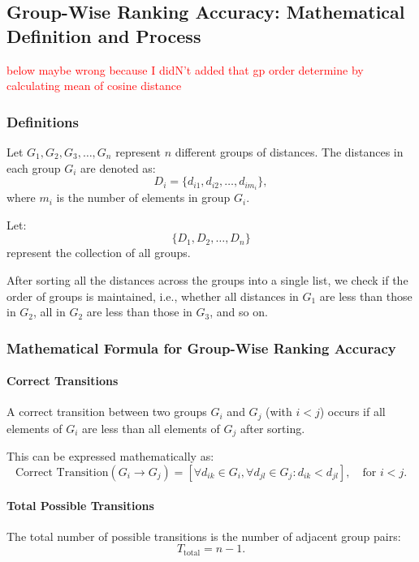 \subsection*{Group-Wise Ranking Accuracy: Mathematical Definition and Process}

\textcolor{red}{below maybe wrong because I didN't added that gp order determine by calculating mean of cosine distance}

\subsubsection*{Definitions}

Let \( G_1, G_2, G_3, \dots, G_n \) represent \( n \) different groups of distances.  
The distances in each group \( G_i \) are denoted as:
\[
D_i = \{d_{i1}, d_{i2}, \dots, d_{im_i}\},
\]
where \( m_i \) is the number of elements in group \( G_i \).  

Let:
\[
\{D_1, D_2, \dots, D_n\}
\]
represent the collection of all groups.

After sorting all the distances across the groups into a single list, we check if the order of groups is maintained, i.e., whether all distances in \( G_1 \) are less than those in \( G_2 \), all in \( G_2 \) are less than those in \( G_3 \), and so on.

\subsubsection*{Mathematical Formula for Group-Wise Ranking Accuracy}

\paragraph{Correct Transitions}
A correct transition between two groups \( G_i \) and \( G_j \) (with \( i < j \)) occurs if all elements of \( G_i \) are less than all elements of \( G_j \) after sorting.  

This can be expressed mathematically as:
\[
\text{Correct Transition}(G_i \to G_j) = 
\left[
\forall d_{ik} \in G_i, \forall d_{jl} \in G_j : d_{ik} < d_{jl}
\right], \quad \text{for } i < j.
\]

\paragraph{Total Possible Transitions}
The total number of possible transitions is the number of adjacent group pairs:
\[
T_{\text{total}} = n - 1.
\]

